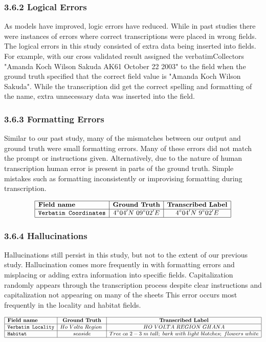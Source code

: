 \documentclass{article}
\begin{document}
\subsubsection*{3.6.2 Logical Errors}
As models have improved, logic errors have reduced. While in past studies there were instances of errors where correct transcriptions were placed in wrong fields. The logical errors in this study consisted of extra data being inserted into fields. For example, with our cross validated result assigned the verbatimCollectors "Amanda Koch Wilson Sakuda AK61 October 22 2003" to the field when the ground truth specified that the correct field value is "Amanda Koch Wilson Sakuda". While the transcription did get the correct spelling and formatting of the name, extra unnecessary data was inserted into the field. 

\subsubsection*{3.6.3 Formatting Errors}
Similar to our past study, many of the mismatches between our output and ground truth were small formatting errors. Many of these errors did not match the prompt or instructions given. Alternatively, due to the nature of human transcription human error is present in parts of the ground truth. Simple mistakes such as formatting inconsistently or improvising formatting during transcription.

$$\small
\begin{array}{|l|c|c|}
\hline
\textbf{Field name} & \textbf{Ground Truth} & \textbf{Transcribed Label} \\
\hline
\texttt{Verbatim Coordinates} & 4^\circ04'N\ 09^\circ02'E & 4^\circ04'N\ 9^\circ02'E \\
\hline
\end{array}
$$

\subsubsection*{3.6.4 Hallucinations}
Hallucinations still persist in this study, but not to the extent of our previous study. Hallucination comes more frequently in with formatting errors and misplacing or adding extra information into specific fields. Capitalization randomly appears through the transcription process despite clear instructions and capitalization not appearing on many of the sheets This error occurs most frequently in  the locality and habitat fields. 

$$\small
\begin{array}{|l|c|c|}
\hline
\textbf{Field name} & \textbf{Ground Truth} & \textbf{Transcribed Label} \\
\hline
\texttt{Verbatim Locality} & Ho\ Volta\ Region\ & HO\ VOLTA\ REGION\ GHANA \\ \hline
\texttt{Habitat} & seaside & Tree\ ca\ 2-3\ m\ tall;\ bark\ with\ light\ blotches;\ flowers\ white \\ 
\hline
\end{array}
$$
\end{document}
